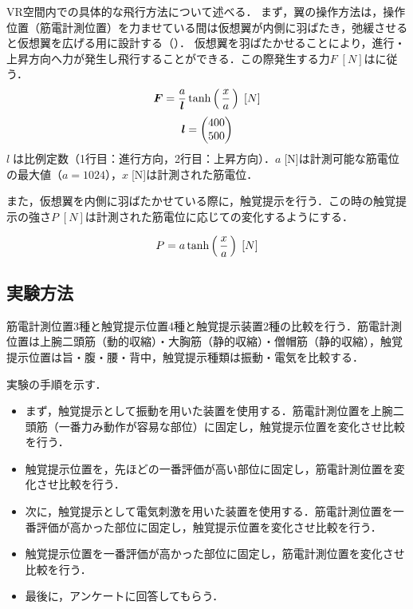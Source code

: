 \begin{small}

        VR空間内での具体的な飛行方法について述べる．
        まず，翼の操作方法は，操作位置（筋電計測位置）を力ませている間は仮想翼が内側に羽ばたき，弛緩させると仮想翼を広げる用に設計する（）．
        仮想翼を羽ばたかせることにより，進行・上昇方向へ力が発生し飛行することができる．この際発生する力$F\;[N]$はに従う．
        \begin{eqnarray}
                \equlabel{force}
                \bm{F}=\frac{a}{\bm{l}}  \tanh\left(\,\frac{x}{a}\,\right) \;[N]
        \end{eqnarray}
        \begin{eqnarray}
                \equlabel{force_prop}
                \bm{l}=\begin{pmatrix}400 \\ 500 \end{pmatrix}
        \end{eqnarray}
        $l\;$は比例定数（1行目：進行方向，2行目：上昇方向）．$a\;$[N]は計測可能な筋電位の最大値（$a=1024$），$x\;$[N]は計測された筋電位．

        また，仮想翼を内側に羽ばたかせている際に，触覚提示を行う．この時の触覚提示の強さ$P\;[N]$は計測された筋電位に応じての変化するようにする．
        
        \begin{eqnarray}
                \equlabel{haptics}
                P=a \tanh\left(\,\frac{x}{a}\,\right) \;[N]
        \end{eqnarray}
        
  \subsection{実験方法}
        筋電計測位置3種と触覚提示位置4種と触覚提示装置2種の比較を行う．筋電計測位置は上腕二頭筋（動的収縮）・大胸筋（静的収縮）・僧帽筋（静的収縮），触覚提示位置は旨・腹・腰・背中，触覚提示種類は振動・電気を比較する．

        実験の手順を示す．
        \begin{itemize}
        \item まず，触覚提示として振動を用いた装置を使用する．筋電計測位置を上腕二頭筋（一番力み動作が容易な部位）に固定し，触覚提示位置を変化させ比較を行う．
        \item 触覚提示位置を，先ほどの一番評価が高い部位に固定し，筋電計測位置を変化させ比較を行う．
        \item 次に，触覚提示として電気刺激を用いた装置を使用する．筋電計測位置を一番評価が高かった部位に固定し，触覚提示位置を変化させ比較を行う．
        \item 触覚提示位置を一番評価が高かった部位に固定し，筋電計測位置を変化させ比較を行う．
        \item 最後に，アンケートに回答してもらう．
        \end{itemize}



\end{small}
